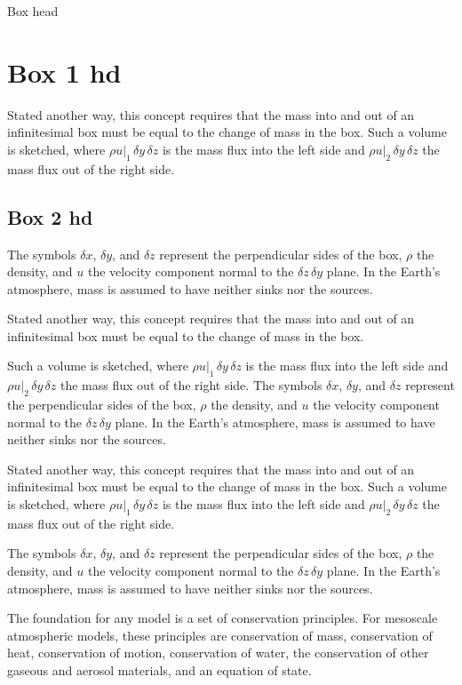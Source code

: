 \documentclass[onecolumn,authoryear]{els-mrw}
\begin{document}
\begin{BoxTypeA}{Box head}
\section*{Box 1 hd}
Stated another way, this concept requires that the
mass into and out of an infinitesimal box must be equal to the change
of mass in the box. Such a volume is sketched,
where $\rho u|_1 \, \delta y \, \delta z$ is the mass flux into the left side
and $\rho u|_2 \,
 \delta y \, \delta z$ the mass flux out of the right side.

\subsection*{Box 2 hd}
The
symbols $\delta x$, $\delta y$, and $\delta z$ represent the
perpendicular sides of the box,  $\rho$ the density, and $u$ the velocity
component normal to the $\delta z \, \delta y$ plane.
In the Earth's atmosphere, mass is assumed to have neither sinks nor the
sources.

Stated another way, this concept requires that the
mass into and out of an infinitesimal box must be equal to the change
of mass in the box.

Such a volume is sketched,
where $\rho u|_1 \, \delta y \, \delta z$ is the mass flux into the left side
and $\rho u|_2 \,
 \delta y \, \delta z$ the mass flux out of the right side. The
symbols $\delta x$, $\delta y$, and $\delta z$ represent the
perpendicular sides of the box,  $\rho$ the density, and $u$ the velocity
component normal to the $\delta z \, \delta y$ plane.
In the Earth's atmosphere, mass is assumed to have neither sinks nor the
sources.

Stated another way, this concept requires that the
mass into and out of an infinitesimal box must be equal to the change
of mass in the box. Such a volume is sketched,
where $\rho u|_1 \, \delta y \, \delta z$ is the mass flux into the left side
and $\rho u|_2 \,
 \delta y \, \delta z$ the mass flux out of the right side.

 The
symbols $\delta x$, $\delta y$, and $\delta z$ represent the
perpendicular sides of the box,  $\rho$ the density, and $u$ the velocity
component normal to the $\delta z \, \delta y$ plane.
In the Earth's atmosphere, mass is assumed to have neither sinks nor the
sources.
\end{BoxTypeA}

The foundation for any model is a set of conservation principles. For mesoscale atmospheric models, these principles are conservation of mass, conservation of heat, conservation of motion, conservation of water, the conservation of other gaseous and aerosol materials, and an equation of state.
\end{document}
